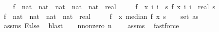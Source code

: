 \begin{isabellebody}
\ \ \isamarkupfalse%
\ f{}\ {\isacharcolon}{\kern0pt}{\isacharcolon}{\kern0pt}\ {\isachardoublequoteopen}{\isacharparenleft}{\kern0pt}nat\ {\isasymtimes}\ nat\ {\isasymRightarrow}\ {\isacharparenleft}{\kern0pt}nat\ {\isasymtimes}\ nat{\isacharparenright}{\kern0pt}{\isacharparenright}{\kern0pt}\ {\isasymRightarrow}\ {\isacharparenleft}{\kern0pt}nat\ {\isasymRightarrow}\ real{\isacharparenright}{\kern0pt}{\isachardoublequoteclose}\isanewline
\ \ \ \ \ {\isachardoublequoteopen}f{}\ {\isacharequal}{\kern0pt}\ {\isacharparenleft}{\kern0pt}{\isasymlambda}x\ i\ {\isacharparenleft}{\kern0pt}{\isasymSum}i\ {\isacharequal}{\kern0pt}\ {}{\isachardot}{\kern0pt}{\isachardot}{\kern0pt}{\isacharless}{\kern0pt}s\ f{}\ x\ i\ i\ {\isacharslash}{\kern0pt}\ real\ s\isanewline
\ \ \isamarkupfalse%
\ f{\isacharprime}{\kern0pt}\ {\isacharcolon}{\kern0pt}{\isacharcolon}{\kern0pt}\ {\isachardoublequoteopen}{\isacharparenleft}{\kern0pt}nat\ {\isasymtimes}\ nat\ {\isasymRightarrow}\ {\isacharparenleft}{\kern0pt}nat\ {\isasymtimes}\ nat{\isacharparenright}{\kern0pt}{\isacharparenright}{\kern0pt}\ {\isasymRightarrow}\ real{\isachardoublequoteclose}\isanewline
\ \ \ \ \ {\isachardoublequoteopen}f{\isacharprime}{\kern0pt}\ {\isacharequal}{\kern0pt}\ {\isacharparenleft}{\kern0pt}{\isasymlambda}x{\isachardot}{\kern0pt}\ median\ {\isacharparenleft}{\kern0pt}f{}\ x{\isacharparenright}{\kern0pt}\ s\isanewline
\isanewline
\ \ \isamarkupfalse%
\ {\isachardoublequoteopen}set\ as\ {\isasymnoteq}\ {\isacharbraceleft}{\kern0pt}{\isacharbraceright}{\kern0pt}{\isachardoublequoteclose}\ \isamarkupfalse%
\ assms\ False\ \isamarkupfalse%
\ blast\isanewline
\ \ \isamarkupfalse%
\ n{\isacharunderscore}{\kern0pt}nonzero{\isacharcolon}{\kern0pt}\ {\isachardoublequoteopen}n\ {\isachargreater}{\kern0pt}\ {}{\isachardoublequoteclose}\ \isamarkupfalse%
\ assms{\isacharparenleft}{\kern0pt}{}{\isacharparenright}{\kern0pt}\ \isamarkupfalse%
\ fastforce\isanewline
\isanewline
\ \ \isamarkupfalse%

\end{isabellebody}
